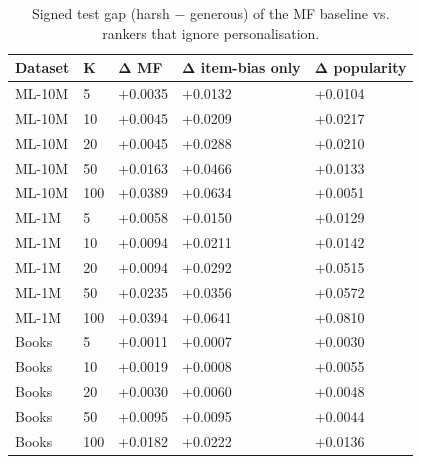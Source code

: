 \begin{table}[h]
\centering
\caption{Signed test gap (harsh − generous) of the MF baseline vs. rankers that ignore personalisation.}
\small
\begin{tabular}{lllll}
\toprule
Dataset & K & Δ MF & Δ item-bias only & Δ popularity \\
\midrule
ML-10M & 5 & +0.0035 & +0.0132 & +0.0104 \\
ML-10M & 10 & +0.0045 & +0.0209 & +0.0217 \\
ML-10M & 20 & +0.0045 & +0.0288 & +0.0210 \\
ML-10M & 50 & +0.0163 & +0.0466 & +0.0133 \\
ML-10M & 100 & +0.0389 & +0.0634 & +0.0051 \\
ML-1M & 5 & +0.0058 & +0.0150 & +0.0129 \\
ML-1M & 10 & +0.0094 & +0.0211 & +0.0142 \\
ML-1M & 20 & +0.0094 & +0.0292 & +0.0515 \\
ML-1M & 50 & +0.0235 & +0.0356 & +0.0572 \\
ML-1M & 100 & +0.0394 & +0.0641 & +0.0810 \\
Books & 5 & +0.0011 & +0.0007 & +0.0030 \\
Books & 10 & +0.0019 & +0.0008 & +0.0055 \\
Books & 20 & +0.0030 & +0.0060 & +0.0048 \\
Books & 50 & +0.0095 & +0.0095 & +0.0044 \\
Books & 100 & +0.0182 & +0.0222 & +0.0136 \\
\bottomrule
\end{tabular}
\end{table}
